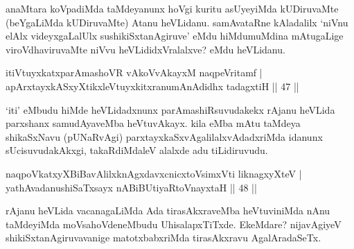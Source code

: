 \begin{artha}
anaMtara koVpadiMda taMdeyanunx hoVgi kuritu asUyeyiMda kUDiruvaMte 
(beYgaLiMda kUDiruvaMte) Atanu heVLidanu. samAvataRne kAladalilx 
`niVnu elAlx videyxgaLalUlx sushikiSxtanAgiruve' eMdu hiMdumuMdina 
mAtugaLige viroVdhaviruvaMte niVvu heVLididxVralalxve? eMdu heVLidanu.
\end{artha}


\begin{shl}
itiVtuyxkatxparAmashoVR \footnotemark[3]vAkoVvAkayxM naqpeVritamf | \\
\footnotemark[2]apArxtayxkASxyXtikxleVtuyxkitxranumAnAdidhx tadagxtiH \hfill|| 47 || 
\end{shl}

\begin{artha}
`iti' eMbudu hiMde heVLidadxnunx parAmashiRsuvudakekx rAjanu heVLida 
parxshanx samudAyaveMba heVtuvAkayx. kila eMba mAtu taMdeya 
shikaSxNavu (pUNaR\-vAgi) parxtayxkaSxvAgalilalxvAdadxriMda idanunx
sUcisuvudakAkxgi, takaRdiMdaleV alalxde adu tiLidiruvudu.
\end{artha}

\begin{shl}
naqpoVkatxyXBiBavAlilxknAgxdavxcnicxtoV\s simxVti liknagxyXteV | \\
yathAvadanushiSaTxsayx nABiBUtiyaRtoV\s nayxtaH \hfill|| 48 || 
\end{shl}

\begin{artha}
rAjanu heVLida vacanagaLiMda Ada tirasAkxraveMba heVtuviniMda 
nAnu taMdeyiMda moVsahoVdeneMbudu UhisalapxTiTxde. EkeMdare? 
nijavAgiyeV shikiSxtanAgiruvavanige matotxbabxriMda tirasAkxravu 
AgalAradaSeTx.
\end{artha}

